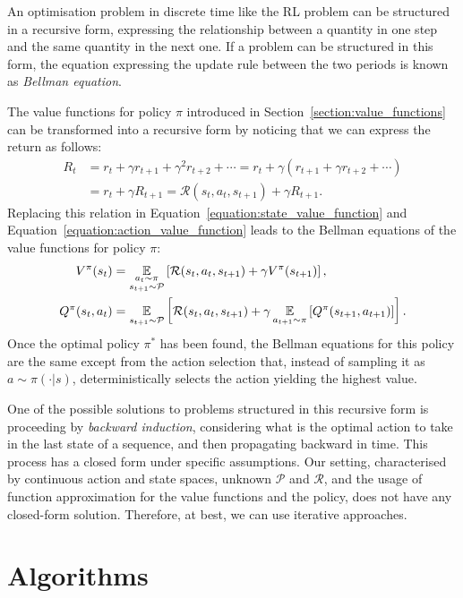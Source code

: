 An optimisation problem in discrete time like the \ac{RL} problem can be structured in a recursive form, \ie expressing the relationship between a quantity in one step and the same quantity in the next one.
If a problem can be structured in this form, the equation expressing the update rule between the two periods is known as \emph{Bellman equation}.

The value functions for policy $\pi$ introduced in Section~\ref{section:value_functions} can be transformed into a recursive form by noticing that we can express the return as follows:
%
\begin{align*}
    R_t
    &= r_t + \gamma r_{t+1} + \gamma^2 r_{t+2} + \cdots = r_t + \gamma \left( r_{t+1} + \gamma r_{t+2} + \cdots \right) \\
    &= r_t + \gamma R_{t+1} = \mathcal{R}(s_t, a_t, s_{t+1}) + \gamma R_{t+1}.
\end{align*}
%
Replacing this relation in Equation~\eqref{equation:state_value_function} and Equation~\eqref{equation:action_value_function} leads to the Bellman equations of the value functions for policy $\pi$:
%
\begin{align*}
    V^\pi(s_t) 
    &= \operatorname*{\mathbb{E}}_{\substack{a_t \sim \pi \\ s_{t+1} \sim \mathcal{P}}} \left[ \mathcal{R}(s_t, a_t, s_{t+1}) + \gamma V^\pi(s_{t+1}) \right] ,\\
    Q^\pi(s_t, a_t) 
    &= \operatorname*{\mathbb{E}}_{s_{t+1} \sim \mathcal{P}} \left[ \mathcal{R}(s_t, a_t, s_{t+1}) + \gamma \operatorname*{\mathbb{E}}_{a_{t+1} \sim \pi} \left[  Q^\pi(s_{t+1}, a_{t+1}) \right] \right] .
\end{align*}
%
Once the optimal policy $\pi^*$ has been found, the Bellman equations for this policy are the same except from the action selection that, instead of sampling it as $a \sim \pi(\cdot|s)$, deterministically selects the action yielding the highest value.

One of the possible solutions to problems structured in this recursive form is proceeding by \emph{backward induction}, \ie considering what is the optimal action to take in the last state of a sequence, and then propagating backward in time.
This process has a closed form under specific assumptions.
Our setting, characterised by continuous action and state spaces, unknown $\mathcal{P}$ and $\mathcal{R}$, and the usage of function approximation for the value functions and the policy, does not have any closed-form solution.
Therefore, at best, we can use iterative approaches.

\section{Algorithms}

